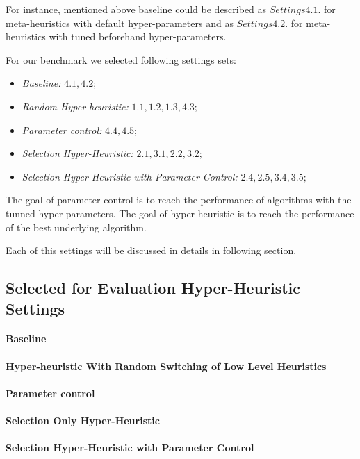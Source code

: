 For instance, mentioned above baseline could be described as $Settings 4.1.$ for meta-heuristics with default hyper-parameters and as $Settings 4.2.$ for meta-heuristics with tuned beforehand hyper-parameters.

For our benchmark we selected following settings sets:

\begin{itemize}
	\item \textit{Baseline:} $4.1, 4.2;$
	\item \textit{Random Hyper-heuristic:} $1.1, 1.2, 1.3, 4.3;$
	\item \textit{Parameter control:} $4.4, 4.5;$
	\item \textit{Selection Hyper-Heuristic:} $2.1, 3.1, 2.2, 3.2;$
	\item \textit{Selection Hyper-Heuristic with Parameter Control:} $2.4, 2.5, 3.4, 3.5;$
\end{itemize}

The goal of parameter control is to reach the performance of algorithms with the tunned hyper-parameters.
The goal of hyper-heuristic is to reach the performance of the best underlying algorithm.

Each of this settings will be discussed in details in following section.


\subsection{Selected for Evaluation Hyper-Heuristic Settings}
\paragraph{Baseline}

\paragraph{Hyper-heuristic With Random Switching of Low Level Heuristics}

\paragraph{Parameter control}

\paragraph{Selection Only Hyper-Heuristic}

\paragraph{Selection Hyper-Heuristic with Parameter Control}


